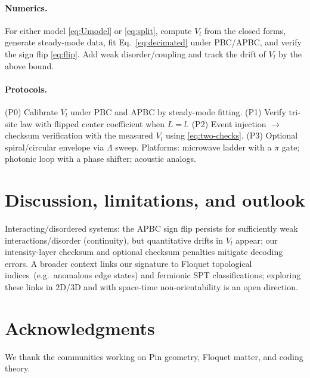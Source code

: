 \documentclass[aps,prb,twocolumn,superscriptaddress,nofootinbib,10pt]{revtex4-2}
\theoremstyle{definition}
\theoremstyle{remark}
\newcommand{\Pin}{\mathrm{Pin}}
\begin{document}
\paragraph*{Numerics.} For either model \eqref{eq:Umodel} or \eqref{eq:split}, compute $V_l$ from the closed forms,
generate steady-mode data, fit Eq.~\eqref{eq:decimated} under PBC/APBC, and verify the sign flip \eqref{eq:flip}.
Add weak disorder/coupling and track the drift of $V_l$ by the above bound.

\paragraph*{Protocols.} (P0) Calibrate $V_l$ under PBC and APBC by steady-mode fitting. (P1) Verify tri-site law with flipped center coefficient when $L=l$.
(P2) Event injection $\to$ checksum verification with the measured $V_l$ using \eqref{eq:two-checks}. (P3) Optional spiral/circular envelope via $\Lambda$ sweep.
Platforms: microwave ladder with a $\pi$ gate; photonic loop with a phase shifter; acoustic analogs.

\section{Discussion, limitations, and outlook}
Interacting/disordered systems: the APBC sign flip persists for sufficiently weak interactions/disorder (continuity), but
quantitative drifts in $V_l$ appear; our intensity-layer checksum and optional checksum penalties mitigate decoding errors.
A broader context links our signature to Floquet topological indices~(e.g.\ anomalous edge states) and fermionic SPT
classifications; exploring these links in 2D/3D and with space-time non-orientability is an open direction.

\section*{Acknowledgments}
We thank the communities working on $\Pin$ geometry, Floquet matter, and coding theory.
\end{document}
